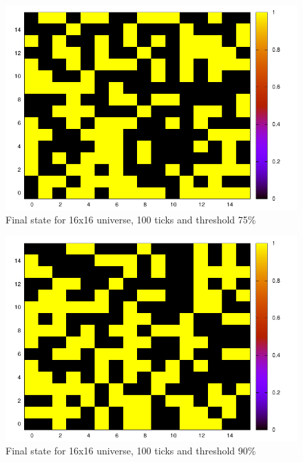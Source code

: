 \documentclass[11pt]{article}
\numberwithin{figure}{section}
\begin{document}
\begin{figure}[t]
\centering
   \includegraphics{gol-16-100-75.pdf}
\caption{Final state for 16x16 universe, 100 ticks and threshold 75\%}
\label{fig:75}
\end{figure}
\begin{figure}[t]
\centering
   \includegraphics{gol-16-100-90.pdf}
\caption{Final state for 16x16 universe, 100 ticks and threshold 90\%}
\label{fig:90}
\end{figure}






%

%
\end{document}
